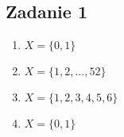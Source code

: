 \subsection{Zadanie 1}

\begin{enumerate}[label=(\alph*)]
\item $X=\{0,1\}$
\item $X=\{1,2,\dots,52\}$
\item $X=\{1,2,3,4,5,6\}$
\item $X=\{0,1\}$
\end{enumerate}
